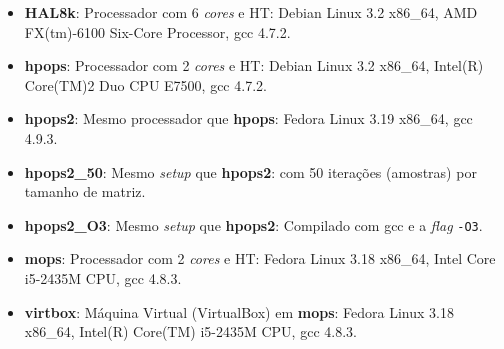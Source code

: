 \begin{itemize}
\item \textbf{HAL8k}: 
Processador com 6 \textit{cores} e HT: Debian Linux 3.2 x86\_64, AMD 
FX(tm)-6100 Six-Core Processor, gcc 4.7.2.
\item \textbf{hpops}: 
Processador com 2 \textit{cores} e HT: Debian Linux 3.2 x86\_64, 
Intel(R) Core(TM)2 Duo CPU E7500, gcc 4.7.2.
\item \textbf{hpops2}: 
Mesmo processador que \textbf{hpops}: Fedora 
Linux 3.19 x86\_64, gcc 4.9.3.
\item \textbf{hpops2\_50}: 
Mesmo \textit{setup} que \textbf{hpops2}: com 50 iterações (amostras) por 
tamanho de matriz.
\item \textbf{hpops2\_O3}: 
Mesmo \textit{setup} que \textbf{hpops2}: Compilado 
com gcc e a \textit{flag} \texttt{-O3}.
\item \textbf{mops}: 
Processador com 2 \textit{cores} e HT: Fedora Linux 3.18 x86\_64, 
Intel Core i5-2435M CPU, gcc 4.8.3.
\item \textbf{virtbox}: 
Máquina Virtual (VirtualBox) em \textbf{mops}:
Fedora Linux 3.18 x86\_64, Intel(R) Core(TM) i5-2435M CPU, gcc 4.8.3.
\end{itemize}
